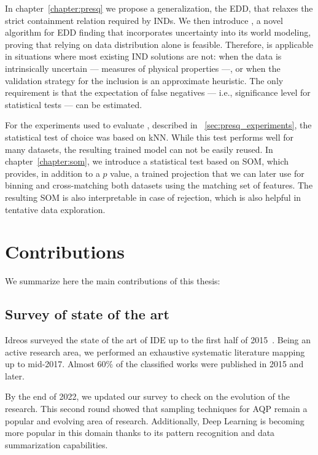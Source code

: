 In chapter~\ref{chapter:presq} we propose a generalization, the \gls{EDD}, that
relaxes the strict containment relation required by \glspl{IND}.
We then introduce \PresQ, a novel algorithm for \gls{EDD} finding that incorporates
uncertainty into its world modeling, proving that relying on data distribution alone is feasible.
Therefore, \PresQ is applicable in situations where most existing \gls{IND} solutions
are not: when the data is intrinsically uncertain --- measures of physical properties ---,
or when the validation strategy for the inclusion is an approximate heuristic.
The only requirement is that the expectation of false negatives --- i.e., significance
level for statistical tests --- can be estimated.

For the experiments used to evaluate \PresQ, described in ~\ref{sec:presq_experiments},
the statistical test of choice was based on \gls{kNN}. While this test
performs well for many datasets, the resulting trained model can not be easily reused.
In chapter~\ref{chapter:som}, we introduce a statistical test based on \gls{SOM}, which provides,
in addition to a $p$ value, a trained projection that we can later use for binning and
cross-matching both datasets using the matching set of features. The resulting \gls{SOM}
is also interpretable in case of rejection, which is also helpful in tentative data exploration.

\section{Contributions}
\label{sec:conclusions_contributions}

We summarize here the main contributions of this thesis:

\subsection{Survey of state of the art}
Idreos \etal surveyed the state of the art of \gls{IDE} up to the first half of 2015~\cite{Idreos2015}.
Being an active research area, we performed an exhaustive systematic literature mapping up to mid-2017.
Almost 60\% of the classified works were published in 2015 and later.

By the end of 2022, we updated our survey to check on the evolution of the research. This second
round showed that sampling techniques for \gls{AQP} remain a popular and evolving
area of research. Additionally, Deep Learning is becoming more popular in this domain thanks to its
pattern recognition and data summarization capabilities.


